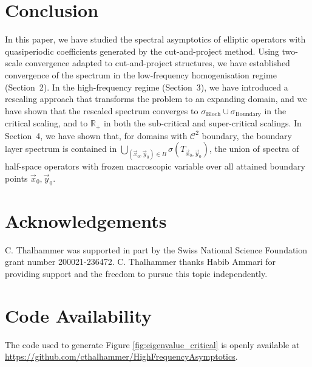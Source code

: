 \documentclass[a4paper,reqno]{amsart}
\numberwithin{equation}{section}
\numberwithin{equation}{section}		%
\numberwithin{figure}{section}			%
\numberwithin{table}{section}				%
\theoremstyle{definition}
\newcommand{\<}{\ensuremath \leq}
\renewcommand{\>}{\ensuremath \geq}
\begin{document}
\section{Conclusion}\label{sec:conclusion}
In this paper, we have studied the spectral asymptotics of elliptic operators with quasiperiodic coefficients generated by the cut-and-project method. Using two-scale convergence adapted to cut-and-project structures, we have established convergence of the spectrum in the low-frequency homogenisation regime (Section~2). In the high-frequency regime (Section~3), we have introduced a rescaling approach that transforms the problem to an expanding domain, and we have shown that the rescaled spectrum converges to $\sigma_{\text{Bloch}}\cup\sigma_{\text{Boundary}}$ in the critical scaling, and to $\mathbb{R}_+$ in both the sub-critical and super-critical scalings. In Section~4, we have shown that, for domains with $\mathcal{C}^2$ boundary, the boundary layer spectrum is contained in $\bigcup_{(\vec{x}_0,\vec{y}_0)\in B}\sigma(T_{\vec{x}_0,\vec{y}_0})$, the union of spectra of half-space operators with frozen macroscopic variable over all attained boundary points $\vec{x}_0,\vec{y}_0$.



\section*{Acknowledgements}
C. Thalhammer was supported in part by the Swiss National Science Foundation grant number 200021-236472. C. Thalhammer thanks Habib Ammari for providing support and the freedom to pursue this topic independently.

\section*{Code Availability}
The code used to generate Figure \ref{fig:eigenvalue_critical} is openly available at \url{https://github.com/cthalhammer/HighFrequencyAsymptotics}.

\printbibliography

%
\end{document}
